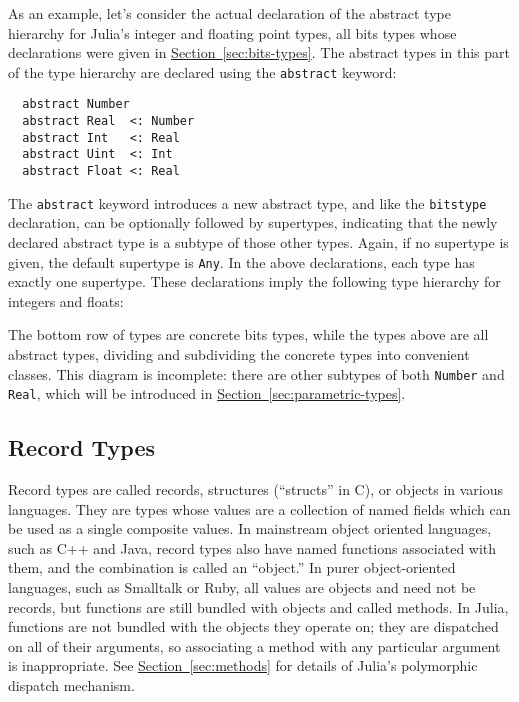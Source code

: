 \documentclass{article}
\renewcommand{\sec}[1]{\label{sec:#1}}
\newcommand{\Section}[1]{\hyperref[sec:#1]{Section~\ref*{sec:#1}}}
\begin{document}
As an example, let's consider the actual declaration of the abstract type hierarchy for Julia's integer and floating point types, all bits types whose declarations were given in \Section{bits-types}.
The abstract types in this part of the type hierarchy are declared using the \verb|abstract| keyword:
\begin{verbatim}
  abstract Number
  abstract Real  <: Number
  abstract Int   <: Real
  abstract Uint  <: Int
  abstract Float <: Real
\end{verbatim}
The \verb|abstract| keyword introduces a new abstract type, and like the \verb|bitstype| declaration, can be optionally followed by supertypes, indicating that the newly declared abstract type is a subtype of those other types.
Again, if no supertype is given, the default supertype is \verb|Any|.
In the above declarations, each type has exactly one supertype.
These declarations imply the following type hierarchy for integers and floats:
\begin{center}
\begin{tikzpicture}[>=latex,line join=bevel,font=\small\tt,scale=0.45]

\end{tikzpicture}
\end{center}
The bottom row of types are concrete bits types, while the types above are all abstract types, dividing and subdividing the concrete types into convenient classes.
This diagram is incomplete:
there are other subtypes of both \verb|Number| and \verb|Real|, which will be introduced in \Section{parametric-types}.

\subsection{Record Types}\sec{record-types}

Record types are called records, structures (``structs'' in C), or objects in various languages.
They are types whose values are a collection of named fields which can be used as a single composite values.
In mainstream object oriented languages, such as C++ and Java, record types also have named functions associated with them, and the combination is called an ``object.''
In purer object-oriented languages, such as Smalltalk or Ruby, all values are objects and need not be records, but functions are still bundled with objects and called methods.
In Julia, functions are not bundled with the objects they operate on;
they are dispatched on all of their arguments, so associating a method with any particular argument is inappropriate.
See \Section{methods} for details of Julia's polymorphic dispatch mechanism.
\end{document}
